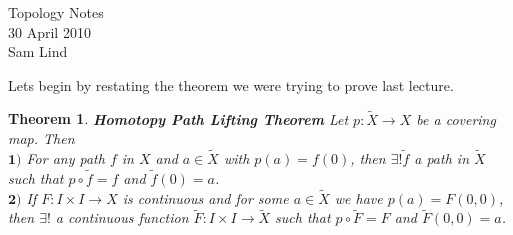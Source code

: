 \documentclass[11pt,reqno]{amsart}
\newtheorem{Theorem}{Theorem}
\theoremstyle{definition}
\begin{document}
    \begin{center}
    \LARGE{Topology Notes} \\
    \vspace{.1in}
    \normalsize{30 April 2010}\\
    \vspace{.1in}
    \normalsize{Sam Lind} \\
    \vspace{.2in}
    \end{center}
   Lets begin by restating the theorem we were trying to prove last lecture.
    \begin{Theorem}
    \textbf{Homotopy Path Lifting Theorem}
    Let $p\colon \tilde{X}\to X$ be a covering map. Then
    \\ $\textbf{1})$ For any path $f$ in $X$ and $a\in \tilde{X}$ with $p(a)=f(0)$, then $\exists ! \tilde{f}$ a path in $\tilde{X}$ such that $p\circ \tilde{f}=f$ and $\tilde{f}(0)=a$. 
    \\ $\textbf{2})$ If $F\colon I\times I\to X$ is continuous and for some $a\in \tilde{X}$ we have $p(a)=F(0,0)$, then $\exists!$ a continuous function $\tilde{F}\colon I\times I\to \tilde{X}$ such that $p\circ \tilde{F}=F$ and $\tilde{F}(0,0)=a$.
    \end{Theorem}
    
\end{document}
